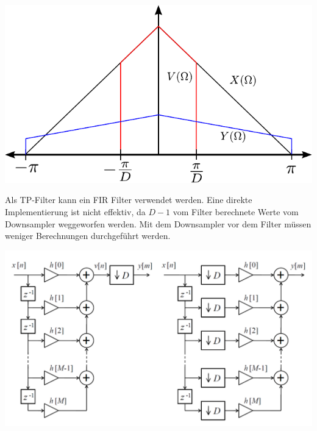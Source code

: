 \begin{center}
	\includegraphics[scale=.6]{./images/decimation_frequenz}
\end{center}
Als TP-Filter kann ein FIR Filter verwendet werden. Eine direkte Implementierung
ist nicht effektiv, da $D-1$ vom Filter berechnete Werte vom Downsampler
weggeworfen werden. Mit dem Downsampler vor dem Filter müssen weniger
Berechnungen durchgeführt werden.
\begin{center}
	\includegraphics[scale=.7]{./images/decimation_scheme}
\end{center}


